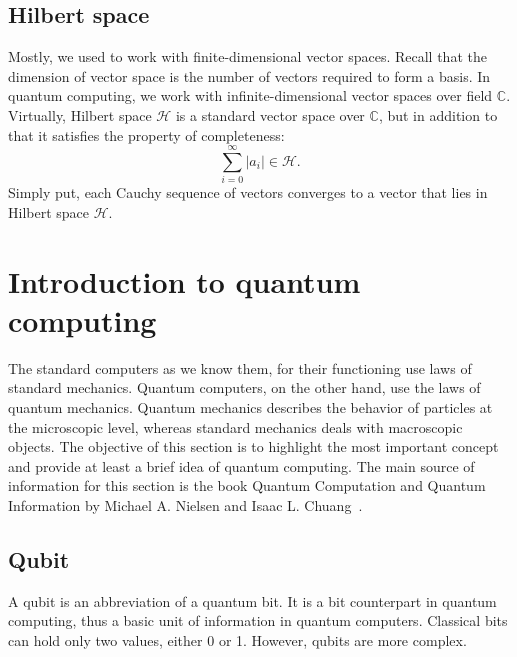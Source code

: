 \subsection*{Hilbert space}
Mostly, we used to work with finite-dimensional vector spaces. Recall that the dimension of vector space is the number of vectors required to form a basis. In quantum computing, we work with infinite-dimensional vector spaces over field $\mathbb{C}$. Virtually, Hilbert space $\mathcal{H}$ is a standard vector space over $\mathbb{C}$, but in addition to that it satisfies the property of completeness:
\begin{equation*}
  \sum_{i=0}^{\infty}\vert a_i \vert \in \mathcal{H}\text{.}
\end{equation*}
Simply put, each Cauchy sequence of vectors converges to a vector that lies in Hilbert space $\mathcal{H}$.


\section{Introduction to quantum computing}
The standard computers as we know them, for their functioning use laws of standard mechanics. Quantum computers, on the other hand, use the laws of quantum mechanics. Quantum mechanics describes the behavior of particles at the microscopic level, whereas standard mechanics deals with macroscopic objects. The objective of this section is to highlight the most important concept and provide at least a brief idea of quantum computing. The main source of information for this section is the book Quantum Computation and Quantum Information by Michael A. Nielsen and Isaac L. Chuang~\cite{qc}.

\subsection*{Qubit}
A qubit is an abbreviation of a quantum bit. It is a bit counterpart in quantum computing, thus a basic unit of information in quantum computers. Classical bits can hold only two values, either 0 or 1. However, qubits are more complex.


